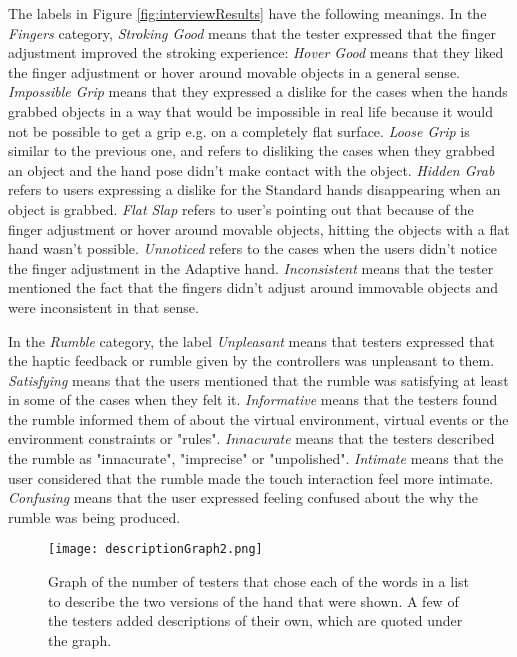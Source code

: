 The labels in Figure \ref{fig:interviewResults} have the following meanings. In the \textit{Fingers} category, \textit{Stroking Good} means that the tester expressed that the finger adjustment improved the stroking experience: \textit{Hover Good} means that they liked the finger adjustment or hover around movable objects in a general sense. \textit{Impossible Grip} means that they expressed a dislike for the cases when the hands grabbed objects in a way that would be impossible in real life because it would not be possible to get a grip e.g. on a completely flat surface. \textit{Loose Grip} is similar to the previous one, and refers to disliking the cases when they grabbed an object and the hand pose didn't make contact with the object. \textit{Hidden Grab} refers to users expressing a dislike for the Standard hands disappearing when an object is grabbed. \textit{Flat Slap} refers to user's pointing out that because of the finger adjustment or hover around movable objects, hitting the objects with a flat hand wasn't possible. \textit{Unnoticed} refers to the cases when the users didn't notice the finger adjustment in the Adaptive hand. \textit{Inconsistent} means that the tester mentioned the fact that the fingers didn't adjust around immovable objects and were inconsistent in that sense.


In the \textit{Rumble} category, the label \textit{Unpleasant} means that testers expressed that the haptic feedback or rumble given by the controllers was unpleasant to them. \textit{Satisfying} means that the users mentioned that the rumble was satisfying at least in some of the cases when they felt it. \textit{Informative} means that the testers found the rumble informed them of about the virtual environment, virtual events or the environment constraints or "rules". \textit{Innacurate} means that the testers described the rumble as "innacurate", "imprecise" or "unpolished". \textit{Intimate} means that the user considered that the rumble made the touch interaction feel more intimate. \textit{Confusing} means that the user expressed feeling confused about the why the rumble was being produced.

\begin{figure}[H]
\centering
\texttt{[image: descriptionGraph2.png]}
\caption{Graph of the number of testers that chose each of the words in a list to describe the two versions of the hand that were shown. A few of the testers added descriptions of their own, which are quoted under the graph.}
\label{fig:descriptionGraph}
\end{figure}

